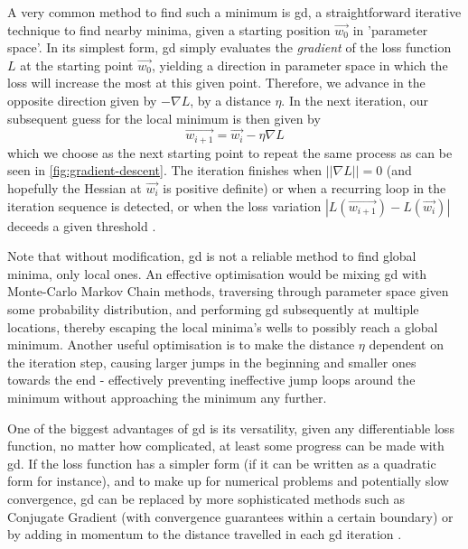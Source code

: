 A very common method to find such a minimum is \gls{gd}, a straightforward iterative technique to find nearby minima, given a starting position $\vec{w_0}$ in 'parameter space'.
In its simplest form, \gls{gd} simply evaluates the \textit{gradient} of the loss function $L$ at the starting point $\vec{w_0}$, yielding a direction in parameter space in which the loss will increase the most at this given point.
Therefore, we advance in the opposite direction given by $-\nabla L$, by a distance $\eta$.
In the next iteration, our subsequent guess for the local minimum is then given by $$\vec{w_{i+1}} = \vec{w_i} - \eta \nabla L$$
which we choose as the next starting point to repeat the same process as can be seen in \cref{fig:gradient-descent}.
The iteration finishes when $||\nabla L|| = 0$ (and hopefully the Hessian at $\vec{w_i}$ is positive definite) or when a recurring loop in the iteration sequence is detected, or when the loss variation $|L(\vec{w_{i+1}}) - L(\vec{w_i})|$ deceeds a given threshold \parencite{bishop-pattern-recognition-and-ml}.

Note that without modification, \gls{gd} is not a reliable method to find global minima, only local ones.
An effective optimisation would be mixing \gls{gd} with Monte-Carlo Markov Chain methods, traversing through parameter space given some probability distribution, and performing \gls{gd} subsequently at multiple locations, thereby escaping the local minima's wells to possibly reach a global minimum.
Another useful optimisation is to make the distance $\eta$ dependent on the iteration step, causing larger jumps in the beginning and smaller ones towards the end - effectively preventing ineffective jump loops around the minimum without approaching the minimum any further.

One of the biggest advantages of \glsdesc{gd} is its versatility, given any differentiable loss function, no matter how complicated, at least some progress can be made with \gls{gd}.
If the loss function has a simpler form (if it can be written as a quadratic form for instance), and to make up for numerical problems and potentially slow convergence, \gls{gd} can be replaced by more sophisticated methods such as Conjugate Gradient (with convergence guarantees within a certain boundary) or by adding in momentum to the distance travelled in each \gls{gd} iteration \parencite{bishop-pattern-recognition-and-ml}.

